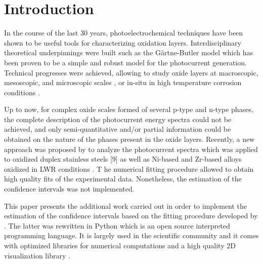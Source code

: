 \section{Introduction}

In the course of the last 30 years, photoelectrochemical techniques have been 
shown to be useful tools for characterizing oxidation layers. 
Interdisciplinary theoretical underpinnings were built 
\citep{morrison1980, vijh1969, stimming1986, diquarto1997, wouters2007} 
such as the Gärtne-Butler model \citep{gartner1959,butler1977} which has been 
proven to be a simple and robust model for the photocurrent generation. 
Technical progresses were achieved, allowing to study oxide layers at 
macroscopic, mesoscopic, and microscopic scales 
\citep{benaboud2007, srisrual2011}, or in-situ in high temperature corrosion 
conditions \citep{bojinov2002,skocic2016}.

Up to now, for complex oxide scales formed of several p-type and n-type phases, 
the complete description of the photocurrent energy spectra could not be achieved, 
and only semi-quantitative and/or partial information could be obtained on the 
nature of the phases present in the oxide layers. Recently, a new approach was 
proposed by \citet{petit2013} to analyze the photocurrent spectra which was 
applied to oxidized duplex stainless steels [9] as well as Ni-based and 
Zr-based alloys oxidized in LWR conditions \citep{skocic2016}. T
he numerical fitting procedure allowed to obtain high quality fits of the 
experimental data. Nonetheless, the estimation of the confidence intervals 
was not implemented.

This paper presents the additional work carried out in order to implement the 
estimation of the confidence intervals based on the fitting procedure 
developed by \citet{petit2013}. The latter was rewritten in Python which is 
an open source interpreted programming language. It is largely used in the 
scientific community \citep{langtangen2012, millman2011, kiusalaas2010, oliphant2007} 
and it comes with optimized libraries for numerical computations 
\citep{vanderwalt2011,jones2020} and a high quality 2D visualization library \citep{hunter2007}.
